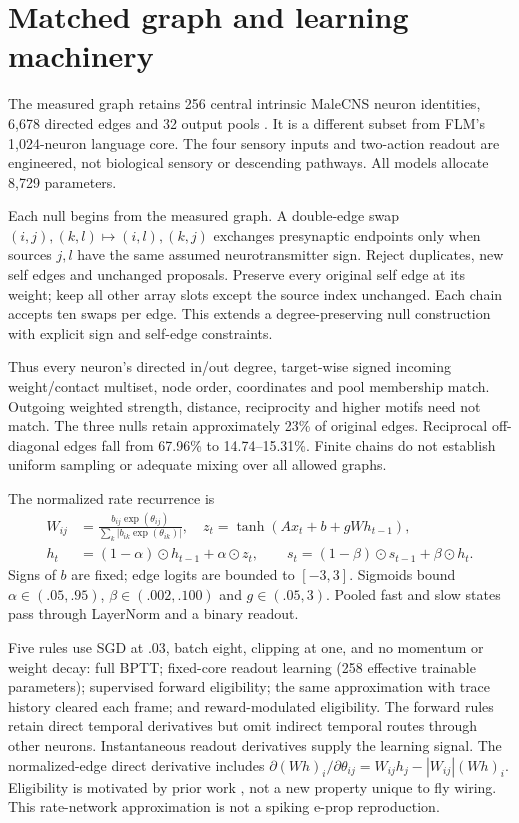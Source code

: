 \documentclass[10pt]{article}
\begin{document}
\newpage
\section{Matched graph and learning machinery}
The measured graph retains 256 central intrinsic MaleCNS neuron identities,
6,678 directed edges and 32 output pools \cite{malecns}. It is a different subset
from FLM's 1,024-neuron language core. The four sensory inputs and two-action
readout are engineered, not biological sensory or descending pathways. All
models allocate 8,729 parameters.

Each null begins from the measured graph. A double-edge swap
$(i,j),(k,l)\mapsto(i,l),(k,j)$ exchanges presynaptic endpoints only when sources
$j,l$ have the same assumed neurotransmitter sign. Reject duplicates, new self
edges and unchanged proposals. Preserve every original self edge at its weight;
keep all other array slots except the source index unchanged. Each chain accepts
ten swaps per edge. This extends a degree-preserving null construction
\cite{maslov2002} with explicit sign and self-edge constraints.

Thus every neuron's directed in/out degree, target-wise signed incoming
weight/contact multiset, node order, coordinates and pool membership match.
Outgoing weighted strength, distance, reciprocity and higher motifs need not
match. The three nulls retain approximately 23\% of original edges. Reciprocal
off-diagonal edges fall from 67.96\% to 14.74--15.31\%. Finite chains do not
establish uniform sampling or adequate mixing over all allowed graphs.

The normalized rate recurrence is
\begin{align}
W_{ij}&=\frac{b_{ij}\exp(\theta_{ij})}{\sum_k|b_{ik}\exp(\theta_{ik})|},\quad
z_t=\tanh(Ax_t+b+gWh_{t-1}),\\
h_t&=(1-\alpha)\odot h_{t-1}+\alpha\odot z_t,\qquad
s_t=(1-\beta)\odot s_{t-1}+\beta\odot h_t.
\end{align}
Signs of $b$ are fixed; edge logits are bounded to $[-3,3]$. Sigmoids bound
$\alpha\in(.05,.95)$, $\beta\in(.002,.100)$ and $g\in(.05,3)$. Pooled fast and
slow states pass through LayerNorm and a binary readout.

Five rules use SGD at .03, batch eight, clipping at one, and no momentum or
weight decay: full BPTT; fixed-core readout learning (258 effective trainable
parameters); supervised forward eligibility; the same approximation with trace
history cleared each frame; and reward-modulated eligibility. The forward rules
retain direct temporal derivatives but omit indirect temporal routes through
other neurons. Instantaneous readout derivatives supply the learning signal.
The normalized-edge direct derivative includes
$\partial (Wh)_i/\partial\theta_{ij}=W_{ij}h_j-|W_{ij}|(Wh)_i$.
Eligibility is motivated by prior work \cite{bellec}, not a new property unique
to fly wiring. This rate-network approximation is not a spiking e-prop reproduction.
\end{document}

